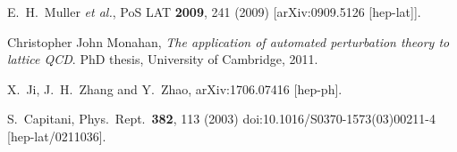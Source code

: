 \documentclass[english,preprint,aps,prd,showpacs,superscriptaddress,nofootinbib,tightenlines]{revtex4}
\begin{document}
\begin{thebibliography}{99}
  E.~H.~Muller {\it et al.},
  PoS LAT {\bf 2009}, 241 (2009)
  [arXiv:0909.5126 [hep-lat]].

  Christopher John Monahan, {\it{The application of automated perturbation theory to lattice QCD}}.
  PhD thesis, University of Cambridge, 2011.


  X.~Ji, J.~H.~Zhang and Y.~Zhao,
  arXiv:1706.07416 [hep-ph].

  S.~Capitani,
  Phys.\ Rept.\  {\bf 382}, 113 (2003)
  doi:10.1016/S0370-1573(03)00211-4
  [hep-lat/0211036].

\end{thebibliography}
\end{document}
